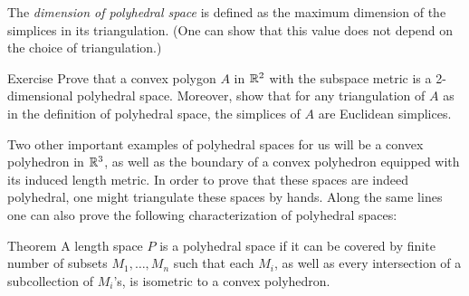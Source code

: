 The \emph{dimension of polyhedral space} is defined as the maximum dimension of the simplices in its triangulation. (One can show that this value does not depend on the choice of triangulation.)

\begin{thm}{Exercise}
Prove that a convex polygon $A$ in $\mathbb{R}^2$ with the subspace metric is a 2-dimensional polyhedral space.  Moreover, show that for any triangulation of $A$ as in the definition of polyhedral space, the simplices of $A$ are Euclidean simplices.
\end{thm}

Two other important examples of polyhedral spaces for us will be
a convex polyhedron in $\mathbb{R}^3$,
as well as the boundary of a convex polyhedron equipped with its induced length metric.
In order to prove that these spaces are indeed polyhedral, 
one might triangulate these spaces by hands. 
Along the same lines one can also prove the following
 characterization of polyhedral spaces:

\begin{thm}{Theorem}
A length space $P$ is a polyhedral space if it can be covered by finite number of subsets $M_1,\dots, M_n$
such that each $M_i$, as well as every intersection of a subcollection of $M_i$'s, is isometric to a convex polyhedron.  
\end{thm}


%



